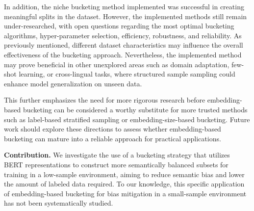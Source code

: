 \documentclass[twocolumn]{article}
\newcounter{ex}
\renewcommand{\indent}{\hspace*{2em}}
\begin{document}
\begin{table}[H]
\centering
\caption{Cross-Bucket vs Within-Bucket Evaluation Metrics}
\label{tab:bucket-comparison}
\end{table}

In addition, the niche bucketing method implemented was successful in creating meaningful splits in the dataset. However, the implemented methods still remain under-researched, with open questions regarding the most optimal bucketing algorithms, hyper-parameter selection, efficiency, robustness, and reliability. As previously mentioned, different dataset characteristics may influence the overall effectiveness of the bucketing approach. Nevertheless, the implemented method may prove beneficial in other unexplored areas such as domain adaptation, few-shot learning, or cross-lingual tasks, where structured sample sampling could enhance model generalization on unseen data.

\indent This further emphasizes the need for more rigorous research before embedding-based bucketing can be considered a worthy substitute for more trusted methods such as label-based stratified sampling or embedding-size-based bucketing. Future work should explore these directions to assess whether embedding-based bucketing can mature into a reliable approach for practical applications.

\indent \textbf{Contribution.} We investigate the use of a bucketing strategy that utilizes BERT representations to construct more semantically balanced subsets for training in a low-sample environment, aiming to reduce semantic bias and lower the amount of labeled data required. To our knowledge, this specific application of embedding-based bucketing for bias mitigation in a small-sample environment has not been systematically studied.


\end{document}
